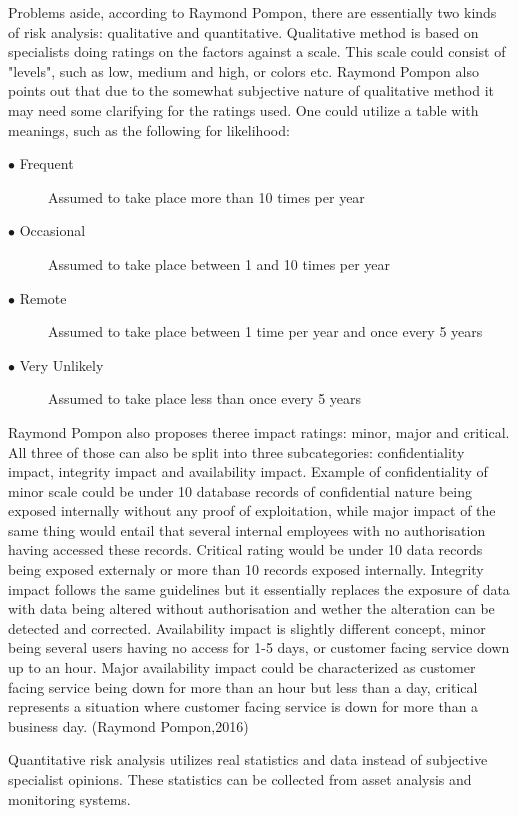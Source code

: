 \documentclass{article}
\begin{document}
\par
Problems aside, according to Raymond Pompon, there are essentially two kinds of risk analysis: qualitative and quantitative. Qualitative method is based on specialists doing ratings on the factors against a scale. This scale could consist of "levels", such as low, medium and high, or colors etc.
Raymond Pompon also points out that due to the somewhat subjective nature of qualitative method it may need some clarifying for the ratings used. One could utilize a table with meanings, such as the following for likelihood:
\begin{description}
	\item[$\bullet$ Frequent] Assumed to take place more than 10 times per year
	\item[$\bullet$ Occasional]Assumed to take place between 1 and 10 times per year
	\item[$\bullet$ Remote] Assumed to take place between 1 time per year and once every 5 years
	\item[$\bullet$ Very Unlikely] Assumed to take place less than once every 5 years
\end{description}
Raymond Pompon also proposes theree impact ratings: minor, major and critical. All three of those can also be split into three subcategories: confidentiality impact, integrity impact and availability impact.
Example of confidentiality of minor scale could be under 10 database records of confidential nature being exposed internally without any proof of exploitation, while major impact of the same thing would entail that several internal employees with no authorisation having accessed these records. Critical rating would be under 10 data records being exposed externaly or more than 10 records exposed internally. Integrity impact follows the same guidelines but it essentially replaces the exposure of data with data being altered without authorisation and wether the alteration can be detected and corrected. Availability impact is slightly different concept, minor being several users having no access for 1-5 days, or customer facing service down up to an hour. Major availability impact could be characterized as customer facing service being down for more than an hour but less than a day, critical represents a situation where customer facing service is down for more than a business day. (Raymond Pompon,2016) 
\par
Quantitative risk analysis utilizes real statistics and data instead of subjective specialist opinions. These statistics can be collected from asset analysis and monitoring systems.
\end{document}
